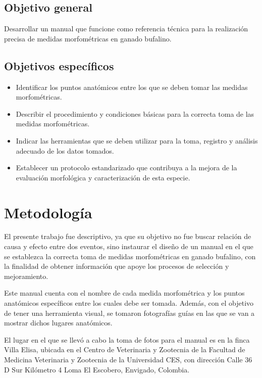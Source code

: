 \documentclass[
]{book}
\providecommand{\tightlist}{%
  \setlength{\itemsep}{0pt}\setlength{\parskip}{0pt}}
\begin{document}
\section{Objetivo general}\label{objetivo-general}

Desarrollar un manual que funcione como referencia técnica para la realización precisa de medidas morfométricas en ganado bufalino.

\section{Objetivos específicos}\label{objetivos-especuxedficos}

\begin{itemize}
\tightlist
\item
  Identificar los puntos anatómicos entre los que se deben tomar las medidas morfométricas.
\item
  Describir el procedimiento y condiciones básicas para la correcta toma de las medidas morfométricas.
\item
  Indicar las herramientas que se deben utilizar para la toma, registro y análisis adecuado de los datos tomados.
\item
  Establecer un protocolo estandarizado que contribuya a la mejora de la evaluación morfológica y caracterización de esta especie.
\end{itemize}

\chapter{Metodología}\label{metodologuxeda}

El presente trabajo fue descriptivo, ya que su objetivo no fue buscar relación de causa y efecto entre dos eventos, sino instaurar el diseño de un manual en el que se establezca la correcta toma de medidas morfométricas en ganado bufalino, con la finalidad de obtener información que apoye los procesos de selección y mejoramiento.

Este manual cuenta con el nombre de cada medida morfométrica y los puntos anatómicos específicos entre los cuales debe ser tomada. Además, con el objetivo de tener una herramienta visual, se tomaron fotografías guías en las que se van a mostrar dichos lugares anatómicos.

El lugar en el que se llevó a cabo la toma de fotos para el manual es en la finca Villa Elisa, ubicada en el Centro de Veterinaria y Zootecnia de la Facultad de Medicina Veterinaria y Zootecnia de la Universidad CES, con dirección Calle 36 D Sur Kilómetro 4 Loma El Escobero, Envigado, Colombia.
\end{document}
